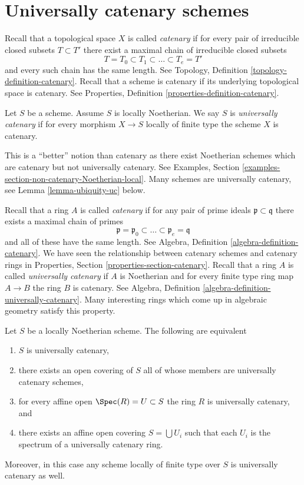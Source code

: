 \section{Universally catenary schemes}
\label{section-universally-catenary}

\noindent
Recall that a topological space $X$ is called {\it catenary} if
for every pair of irreducible closed subsets $T \subset T'$
there exist a maximal chain of irreducible closed subsets
$$
T = T_0 \subset T_1 \subset \ldots \subset T_e = T'
$$
and every such chain has the same length. See
Topology, Definition \ref{topology-definition-catenary}.
Recall that a scheme is catenary if its underlying topological space
is catenary. See Properties, Definition \ref{properties-definition-catenary}.

\begin{definition}
\label{definition-universally-catenary}
Let $S$ be a scheme. Assume $S$ is locally Noetherian.
We say $S$ is {\it universally catenary} if for every
morphism $X \to S$ locally of finite type the scheme $X$ is catenary.
\end{definition}

\noindent
This is a ``better'' notion than catenary as there exist Noetherian schemes
which are catenary but not universally catenary. See
Examples, Section \ref{examples-section-non-catenary-Noetherian-local}.
Many schemes are universally catenary, see
Lemma \ref{lemma-ubiquity-uc} below.

\medskip\noindent
Recall that a ring $A$ is called {\it catenary} if
for any pair of prime ideals $\mathfrak p \subset \mathfrak q$
there exists a maximal chain of primes
$$
\mathfrak p =
\mathfrak p_0 \subset \ldots \subset \mathfrak p_e
= \mathfrak q
$$
and all of these have the same length. See
Algebra, Definition \ref{algebra-definition-catenary}.
We have seen the relationship between catenary schemes and
catenary rings in Properties, Section \ref{properties-section-catenary}.
Recall that a ring $A$ is called {\it universally catenary} if
$A$ is Noetherian and for every finite type ring map $A \to B$
the ring $B$ is catenary. See
Algebra, Definition \ref{algebra-definition-universally-catenary}.
Many interesting rings which come up
in algebraic geometry satisfy this property.

\begin{lemma}
\label{lemma-universally-catenary-local}
Let $S$ be a locally Noetherian scheme. The following are equivalent
\begin{enumerate}
\item $S$ is universally catenary,
\item there exists an open covering of $S$ all of whose members are
universally catenary schemes,
\item for every affine open $\Spec(R) = U \subset S$ the ring
$R$ is universally catenary, and
\item there exists an affine open covering $S = \bigcup U_i$ such
that each $U_i$ is the spectrum of a universally catenary ring.
\end{enumerate}
Moreover, in this case any scheme locally of finite type over $S$
is universally catenary as well.
\end{lemma}

